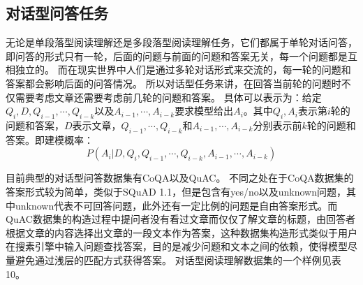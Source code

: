 \subsection{对话型问答任务}\label{cmrc}
%
%
无论是单段落型阅读理解还是多段落型阅读理解任务，它们都属于单轮对话问答，即问答的形式只有一轮，后面的问题与前面的问题和答案无关，每一个问题都是互相独立的。
而在现实世界中人们是通过多轮对话形式来交流的，每一轮的问题和答案都会影响后面的问答情况。
所以对话型任务来讲，在回答当前轮的问题时不仅需要考虑文章还需要考虑前几轮的问题和答案。
具体可以表示为：给定$Q_i,D,Q_{i-1},\cdots,Q_{i-k}$以及$A_{i-1},\cdots,A_{i-k}$要求模型给出$A_{i}$。其中$Q_i,A_i$表示第$i$轮的问题和答案，$D$表示文章，$Q_{i-1},\cdots,Q_{i-k}$和$A_{i-1},\cdots,A_{i-k}$分别表示前$k$轮的问题和答案。即建模概率：
\begin{equation}
P(A_i|D,Q_i,Q_{i-1},\cdots,Q_{i-k},A_{i-1},\cdots,A_{i-k})
\end{equation}

目前典型的对话型问答数据集有CoQA以及QuAC。
不同之处在于CoQA数据集的答案形式较为简单，类似于SQuAD 1.1\cite{SQuAD1}，但是包含有yes/no以及unknown问题，其中unknown代表不可回答问题，此外还有一定比例的问题是自由答案形式。而QuAC数据集的构造过程中提问者没有看过文章而仅仅了解文章的标题，由回答者根据文章的内容选择出文章的一段文本作为答案，这种数据集构造形式类似于用户在搜素引擎中输入问题查找答案，目的是减少问题和文本之间的依赖，使得模型尽量避免通过浅层的匹配方式获得答案。
对话型阅读理解数据集的一个样例见表10。

